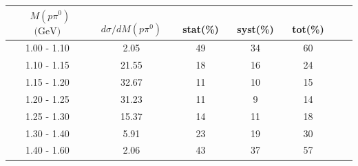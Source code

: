 \documentclass[aps, prd, reprint,showpacs,  preprintnumbers,amsmath,amssymb,superscriptaddress, nofootinbib]{revtex4-1}
\makeatletter
\renewenvironment{table}
  {\def\@captype{table}}
  {}
\makeatother
\begin{document}
\begin{table}
\centering
\begin{tabular}{ccccccc}
\hline
~$M(p\pi^{0})$ $\text{(GeV)}$ &~~ $d\sigma/dM(p\pi^{0})$ &~ stat(\%) &~ syst(\%) &~ tot(\%)  \\
\hline
   1.00 - 1.10 &   2.05 &   49 &   34 &   60 \\
   1.10 - 1.15 &  21.55 &   18 &   16 &   24 \\
   1.15 - 1.20 &  32.67 &   11 &   10 &   15 \\
   1.20 - 1.25 &  31.23 &   11 &    9 &   14 \\
   1.25 - 1.30 &  15.37 &   14 &   11 &   18 \\
   1.30 - 1.40 &   5.91 &   23 &   19 &   30 \\
   1.40 - 1.60 &   2.06 &   43 &   37 &   57 \\
\hline\hline
\end{tabular}
\smallskip
\caption{Flux-averaged differential cross section in $p\pi^{0}$ invariant mass, 
$d\sigma/dM(p\pi^{0}) (10^{-40}\text{cm}^2/\text{nucleon}/(\text{GeV}))$, 
for $\pi^0$+nucleon(s) production with statistical (stat), systematic (syst), and total (tot) uncertainties.
NOTE: Result is for the $\Delta$-enriched subsample with $T_{p}>100$\,MeV and $W<1.4$\,GeV.}
\label{tb:M-ppizW14}
\end{table}
\smallskip
\smallskip
\smallskip
\smallskip
\smallskip
\smallskip
\smallskip
\smallskip
\smallskip

\end{document}
